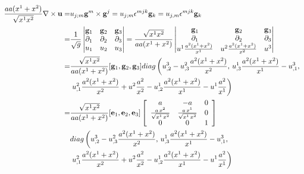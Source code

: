 \documentclass[UTF8,zihao=5]{ctexart}
\newcommand{\bm}[1]{{\mathbf{#1}}}
\begin{document}
\begin{equation}
    \begin{aligned}
        \frac{aa(x^1+x^2)}{\sqrt{x^1x^2}}
        \nabla\times\uu
        = & u_{j;m}\g^m\times\g^j
        =u_{j;m}\epsilon^{mjk}\g_k
        =u_{j,m}\epsilon^{mjk}\g_k                           \\
        = & \frac{1}{\sqrt{g}}\left|
        \begin{matrix}
            \g_1       & \g_2       & \g_3       \\
            \partial_1 & \partial_2 & \partial_3 \\
            u_1        & u_2        & u_3
        \end{matrix}
        \right|
        =\frac{\sqrt{x^1x^2}}{aa(x^1+x^2)}
        \left|
        \begin{matrix}
            \g_1                        & \g_2                        & \g_3       \\
            \partial_1                  & \partial_2                  & \partial_3 \\
            u^1\frac{a^2(x^1+x^2)}{x^1} & u^2\frac{a^2(x^1+x^2)}{x^2} & u^3
        \end{matrix}
        \right|                                              \\
        = & \frac{\sqrt{x^1x^2}}{aa(x^1+x^2)}
        [\g_1,\g_2,\g_3]
        diag\left(
        u^3_{,2}-u^2_{,3}\frac{a^2(x^1+x^2)}{x^2},\,
        u^1_{,3}\frac{a^2(x^1+x^2)}{x^1}-u^3_{,1},\, \right. \\
          & \left.
        u^2_{,1}\frac{a^2(x^1+x^2)}{x^2}+u^2\frac{a^2}{x^2}
        -
        u^1_{,2}\frac{a^2(x^1+x^2)}{x^1}-u^1\frac{a^2}{x^1}
        \right)                                              \\
        = & \frac{\sqrt{x^1x^2}}{aa(x^1+x^2)}
        [\bm{e}_1,\bm{e}_2,\bm{e}_3]
        \left[\begin{array}{ccc} a & -a & 0\\ \frac{a\,x^{2}}{\sqrt{x^{1}\,x^{2}}} & \frac{a\,x^{1}}{\sqrt{x^{1}\,x^{2}}} & 0\\ 0 & 0 & 1 \end{array}\right]              \\
          & diag\left(
        u^3_{,2}-u^2_{,3}\frac{a^2(x^1+x^2)}{x^2},\,
        u^1_{,3}\frac{a^2(x^1+x^2)}{x^1}-u^3_{,1},\, \right. \\
          & \left.
        u^2_{,1}\frac{a^2(x^1+x^2)}{x^2}+u^2\frac{a^2}{x^2}
        -
        u^1_{,2}\frac{a^2(x^1+x^2)}{x^1}-u^1\frac{a^2}{x^1}
        \right)
    \end{aligned}
    \label{eq:curlu}
\end{equation}
\end{document}

